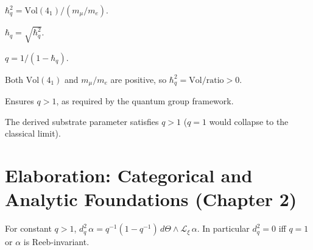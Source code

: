 \begin{definition}
  \label{def:h-q-squared}
  \leanok
  $\hbar_q^2 = \mathrm{Vol}(4_1) / (m_\mu/m_e)$.
\end{definition}

\begin{definition}
  \label{def:h-q-value}
  \leanok
  $\hbar_q = \sqrt{\hbar_q^2}$.
\end{definition}

\begin{definition}[$q$ (derived)]
  \label{def:derived-q}
  \leanok
  $q = 1 / (1 - \hbar_q)$.
\end{definition}

\begin{lemma}[$\hbar_q^2 > 0$]
  \label{lem:hq-squared-pos}
  Both $\mathrm{Vol}(4_1)$ and $m_\mu/m_e$ are positive,
  so $\hbar_q^2 = \mathrm{Vol}/\mathrm{ratio} > 0$.
\end{lemma}

\begin{lemma}[$\hbar_q \in (0,1)$]
  \label{lem:hq-unit-interval}
  Ensures $q > 1$, as required by the quantum group framework.
\end{lemma}

\begin{lemma}[$q > 1$]
  \label{lem:derived-q-gt-one}
  The derived substrate parameter satisfies $q > 1$
  ($q = 1$ would collapse to the classical limit).
\end{lemma}


\chapter{Elaboration: Categorical and Analytic Foundations (Chapter 2)}

\begin{proposition}
  \label{prop:dq-squared}
  For constant $q > 1$, $d_q^2\,\alpha = q^{-1}(1-q^{-1})\,d\varTheta \wedge \mathcal{L}_\xi\,\alpha$.
  In particular $d_q^2 = 0$ iff $q=1$ or $\alpha$ is Reeb-invariant.
\end{proposition}


